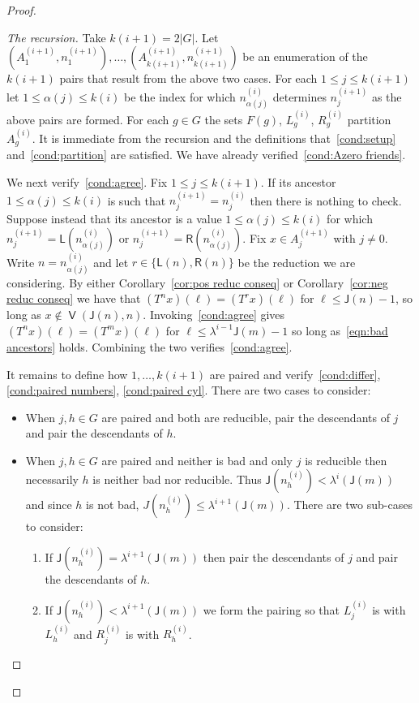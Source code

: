 \documentclass[10pt]{amsart}
\theoremstyle{definition}\newtheorem{defi}[theo]{Definition}\newtheorem{rema}[theo]{Remark}\newtheorem{exam}[theo]{Example}\newtheorem{exem}[theo]{Example}\newtheorem{nota}[theo]{Notation}
\DeclareMathOperator{\bad}{\mathsf{V}}
\newcommand{\lft}{\mathsf{L}}
\newcommand{\rht}{\mathsf{R}}
\newcommand{\scl}{\mathsf{J}}
\begin{document}
\begin{proof}
\begin{proof}[{The recursion}]
Take $k(i+1) = 2|G|$. Let $(A^{(i+1)}_1, n^{(i+1)}_1),\dots,(A^{(i+1)}_{k(i+1)}, n^{(i+1)}_{k(i+1)})$ be an enumeration of the $k(i+1)$ pairs that result from the above two cases. For each $1 \le j \le k(i+1)$ let $1 \le \alpha(j) \le k(i)$ be the index for which $n^{(i)}_{\alpha(j)}$ determines $n^{(i+1)}_j$ as the above pairs are formed. For each $g \in G$ the sets $F(g)$, $L^{(i)}_g$, $R^{(i)}_g$ partition $A^{(i)}_g$. It is immediate from the recursion and the definitions that~\eqref{cond:setup} and~\eqref{cond:partition} are satisfied. We have already verified~\eqref{cond:Azero friends}.

We next verify~\eqref{cond:agree}. Fix $1 \le j \le k(i+1)$. If its ancestor $1
\le \alpha(j) \le k(i)$ is such that $n^{(i+1)}_j = n^{(i)}_j$ then there is nothing to check. Suppose instead that its ancestor is a value $1 \le
\alpha(j) \le k(i)$ for which $n^{(i+1)}_j = \lft(n^{(i)}_{\alpha(j)})$ or $n^{(i+1)}_j = \rht(n^{(i)}_{\alpha(j)})$. Fix $x \in A^{(i+1)}_j$ with $j
\ne 0$. Write $n = n_{\alpha(j)}^{(i)}$ and let $r \in \{\lft(n),\rht(n)\}$ be the reduction we are considering. By either Corollary~\ref{cor:pos reduc conseq} or Corollary~\ref{cor:neg reduc conseq} we have that $(T^n x)(\ell) = (T^r x)(\ell)$ for $\ell \leq\scl(n)-1$, so long as $x \notin
\bad(\scl(n),n)$. Invoking~\eqref{cond:agree} gives $(T^n x)(\ell) = (T^m x)(\ell)$ for $\ell\leq \lambda^{i-1}\scl(m)-1$ so long as~\eqref{eqn:bad ancestors} holds. Combining the two verifies~\eqref{cond:agree}.


It remains to define how $1,\dots,k(i+1)$ are paired and verify~\eqref{cond:differ}, \eqref{cond:paired numbers}, \eqref{cond:paired cyl}. There are two cases to consider:
\begin{itemize}
\item When $j,h \in G$ are paired and both are reducible, pair the descendants of $j$ and pair the descendants of $h$.
\item When $j,h \in G$ are paired and neither is bad and only $j$ is reducible then necessarily $h$ is neither bad nor reducible. Thus $\scl(n^{(i)}_h) < \lambda^i(\scl(m))$ and since $h$ is not bad, $J(n^{(i)}_h)\leq \lambda^{i+1}(\scl(m))$. There are two sub-cases to consider:
\begin{enumerate}
\item\label{subcase1} If $\scl(n_h^{(i)}) = \lambda^{i+1}(\scl(m))$ then pair the descendants of $j$ and pair the descendants of $h$.
\item\label{subcase2} If $\scl(n_h^{(i)}) < \lambda^{i+1}(\scl(m))$ we form the pairing so that $L^{(i)}_j$ is with $L^{(i)}_h$ and $R^{(i)}_j$ is with $R^{(i)}_h$.
\end{enumerate}
\end{itemize}


\end{proof}
\end{proof}
\end{document}

